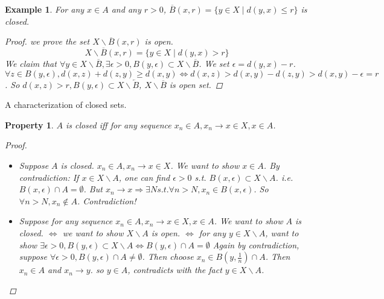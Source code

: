 \documentclass{article}
\newtheorem*{property}{Property}
\newtheorem*{example}{Example}
\begin{document}
\begin{example}
    For any $x \in A$ and any $r > 0$, $\overline{B}(x, r) = \{y \in X \mid d(y, x) \le r\}$ is closed.
    \begin{proof}
        we prove the set $X \backslash \overline{B}(x, r)$ is open.
        \[
            X \backslash \overline{B}(x, r) = \{y \in X \mid d(y, x) > r\}
        \]
        We claim that $\forall y \in X \backslash \overline{B}, \exists \epsilon > 0, B(y, \epsilon) \subset X \backslash \overline{B}$.
        We set $\epsilon = d(y, x) - r$.
        $\forall z \in B(y, \epsilon), d(x, z) + d(z, y) \ge d(x, y) \Leftrightarrow d(x, z) > d(x, y) - d(z, y) > d(x, y) - \epsilon = r$.
        So $d(x, z) > r, B(y, \epsilon) \subset X \backslash \overleftarrow{B}$,
        $X \backslash \overline{B}$ is open set.
    \end{proof}
\end{example}
A characterization of closed sets.
\begin{property}
    $A$ is closed iff for any sequence $x_n \in A, x_n \rightarrow x \in X, x \in A$.
    \begin{proof} \hfill
        \begin{itemize}
            \item Suppose $A$ is closed. $x_n \in A, x_n \rightarrow x \in X$. We want to show $x \in A$. 
            By contradiction: If $x \in X \backslash A$, one can find $\epsilon > 0$ s.t. $B(x, \epsilon) \subset X \backslash A$.
            i.e. $B(x, \epsilon) \cap A = \emptyset$.
            But $x_n \rightarrow x \Rightarrow \exists N s.t. \forall n > N, x_n \in B(x, \epsilon)$.
            So $\forall n > N, x_n \notin A$. Contradiction!
            \item Suppose for any sequence $x_n \in A, x_n \rightarrow x \in X, x \in A$.
            We want to show $A$ is closed. $\Leftrightarrow$ we want to show $X \backslash A$ is open.
            $\Leftrightarrow$ for any $y \in X \backslash A$, 
            want to show $\exists \epsilon > 0, B(y, \epsilon) \subset X \backslash A \Leftrightarrow B(y, \epsilon) \cap A = \emptyset$
            Again by contradiction, suppose $\forall \epsilon > 0, B(y, \epsilon) \cap A \ne \emptyset$.
            Then choose $x_n \in B(y, \frac{1}{n}) \cap A$. Then $x_n \in A$ and $x_n \rightarrow y$. 
            so $y \in A$, contradicts with the fact $y \in X \backslash A$.
        \end{itemize}
    \end{proof}
\end{property}
\end{document}
